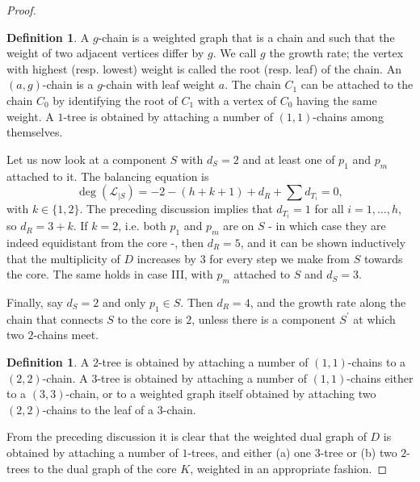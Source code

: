 \documentclass[11pt]{amsart}
\theoremstyle{plain}
\theoremstyle{definition}
\newtheorem{dfn}[thm]{Definition}
\begin{document}
\begin{proof}
\begin{dfn}
 A $g$-chain is a weighted graph that is a chain and such that the weight of two adjacent vertices differ by $g$. We call $g$ the growth rate; the vertex with highest (resp. lowest) weight is called the root (resp. leaf) of the chain. An $(a,g)$-chain is a $g$-chain with leaf weight $a$. The chain $C_1$ can be attached to the chain $C_0$ by identifying the root of $C_1$ with a vertex of $C_0$ having the same weight. A $1$-tree is obtained by attaching a number of $(1,1)$-chains among themselves.
\end{dfn}

Let us now look at a component $S$ with $d_S=2$ and at least one of $p_1$ and $p_m$ attached to it. The balancing equation is
\[\deg(\mathcal L_{|S})= -2-(h+k+1)+d_R+\sum d_{T_i}=0,\]
with $k\in\{1,2\}$. The preceding discussion implies that $d_{T_i}=1$ for all $i=1,\ldots,h$, so $d_R=3+k$. If $k=2$, i.e. both $p_1$ and $p_m$ are on $S$ - in which case they are indeed equidistant from the core -, then $d_R=5$, and it can be shown inductively that the multiplicity of $D$ increases by $3$ for every step we make from $S$ towards the core. The same holds in case III, with $p_m$ attached to $S$ and $d_S=3$.

Finally, say $d_S=2$ and only $p_1\in S$. Then $d_R=4$, and the growth rate along the chain that connects $S$ to the core is $2$, unless there is a component $S^\prime$ at which two $2$-chains meet.

\begin{dfn}
 A $2$-tree is obtained by attaching a number of $(1,1)$-chains to a $(2,2)$-chain. A $3$-tree is obtained by attaching a number of $(1,1)$-chains either to a $(3,3)$-chain, or to a weighted graph itself obtained by attaching two $(2,2)$-chains to the leaf of a $3$-chain.
\end{dfn}

From the preceding discussion it is clear that the weighted dual graph of $D$ is obtained by attaching a number of $1$-trees, and either (a) one $3$-tree or (b) two $2$-trees to the dual graph of the core $K$, weighted in an appropriate fashion.


\end{proof}
\end{document}
